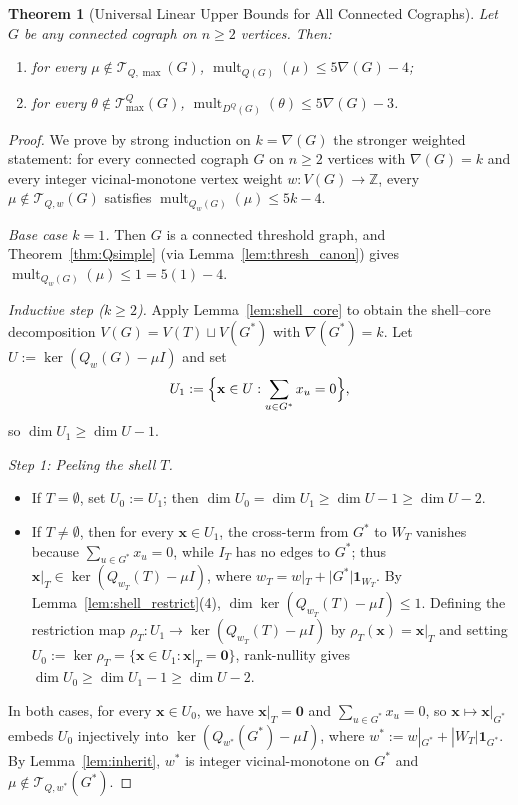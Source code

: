 \documentclass[11pt,a4paper]{article}
\newtheorem{theorem}{Theorem}[section]
\theoremstyle{definition}
\DeclareMathOperator{\mult}{mult}
\begin{document}
\begin{theorem}[Universal Linear Upper Bounds for All Connected Cographs]\label{thm:cograph_upper}
  Let $G$ be any connected cograph on $n \ge 2$ vertices. Then:
  \begin{enumerate}
    \item for every $\mu \notin \mathcal{T}_{Q,\max}(G)$, $\mult_{Q(G)}(\mu) \le 5\nabla(G) - 4$;
    \item for every $\theta \notin \mathcal{T}^Q_{\max}(G)$, $\mult_{D^Q(G)}(\theta) \le 5\nabla(G) - 3$.
  \end{enumerate}
\end{theorem}

\begin{proof}
  We prove by strong induction on $k = \nabla(G)$ the stronger weighted statement: for every connected cograph $G$ on $n \ge 2$ vertices with $\nabla(G) = k$ and every integer vicinal-monotone vertex weight $w : V(G) \to \mathbb{Z}$, every $\mu \notin \mathcal{T}_{Q,w}(G)$ satisfies $\mult_{Q_w(G)}(\mu) \le 5k - 4$.

  \emph{Base case $k = 1$.} Then $G$ is a connected threshold graph, and Theorem~\ref{thm:Qsimple} (via Lemma~\ref{lem:thresh_canon}) gives $\mult_{Q_w(G)}(\mu) \le 1 = 5(1) - 4$.

  \emph{Inductive step ($k \ge 2$).} Apply Lemma~\ref{lem:shell_core} to obtain the shell--core decomposition $V(G) = V(T) \sqcup V(G^*)$ with $\nabla(G^*) = k$. Let $U := \ker(Q_w(G) - \mu I)$ and set
  \[
    U_1 := \Bigl\{\mathbf{x} \in U : \sum_{u \in G^*} x_u = 0\Bigr\},
  \]
  so $\dim U_1 \ge \dim U - 1$.

  \emph{Step 1: Peeling the shell $T$.}
  \begin{itemize}
    \item If $T = \emptyset$, set $U_0 := U_1$; then $\dim U_0 = \dim U_1 \ge \dim U - 1 \ge \dim U - 2$.
    \item If $T \ne \emptyset$, then for every $\mathbf{x} \in U_1$, the cross-term from $G^*$ to $W_T$ vanishes because $\sum_{u \in G^*} x_u = 0$, while $I_T$ has no edges to $G^*$; thus $\mathbf{x}|_T \in \ker(Q_{w_T}(T) - \mu I)$, where $w_T = w|_T + |G^*|\mathbf{1}_{W_T}$. By Lemma~\ref{lem:shell_restrict}(4), $\dim\ker(Q_{w_T}(T) - \mu I) \le 1$. Defining the restriction map $\rho_T : U_1 \to \ker(Q_{w_T}(T) - \mu I)$ by $\rho_T(\mathbf{x}) = \mathbf{x}|_T$ and setting $U_0 := \ker \rho_T = \{\mathbf{x} \in U_1 : \mathbf{x}|_T = \mathbf{0}\}$, rank-nullity gives $\dim U_0 \ge \dim U_1 - 1 \ge \dim U - 2$.
  \end{itemize}
  In both cases, for every $\mathbf{x} \in U_0$, we have $\mathbf{x}|_T = \mathbf{0}$ and $\sum_{u \in G^*} x_u = 0$, so $\mathbf{x} \mapsto \mathbf{x}|_{G^*}$ embeds $U_0$ injectively into $\ker(Q_{w^*}(G^*) - \mu I)$, where $w^* := w|_{G^*} + |W_T|\mathbf{1}_{G^*}$. By Lemma~\ref{lem:inherit}, $w^*$ is integer vicinal-monotone on $G^*$ and $\mu \notin \mathcal{T}_{Q,w^*}(G^*)$.


\end{proof}
\end{document}
